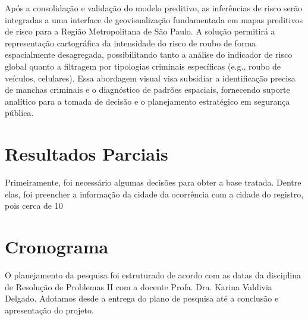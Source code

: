 \documentclass[12pt]{article}
\begin{document}
Após a consolidação e validação do modelo preditivo, as inferências de risco serão integradas a uma interface de geovisualização fundamentada em mapas preditivos de risco para a Região Metropolitana de São Paulo. A solução permitirá a representação cartográfica da intensidade do risco de roubo de forma espacialmente desagregada, possibilitando tanto a análise do indicador de risco global quanto a filtragem por tipologias criminais específicas (e.g., roubo de veículos, celulares). Essa abordagem visual visa subsidiar a identificação precisa de manchas criminais e o diagnóstico de padrões espaciais, fornecendo suporte analítico para a tomada de decisão e o planejamento estratégico em segurança pública.

\vspace{1.2cm}
\section{Resultados Parciais}
Primeiramente, foi necessário algumas decisões para obter a base tratada. Dentre elas, foi preencher a informação da cidade da ocorrência com a cidade do registro, pois cerca de 10%

\clearpage
\section{Cronograma}
O planejamento da pesquisa foi estruturado de acordo com as datas da disciplina de Resolução de Problemas II com a docente Profa. Dra. Karina Valdivia Delgado. Adotamos desde a entrega do plano de pesquisa até a conclusão e apresentação do projeto.
\end{document}
